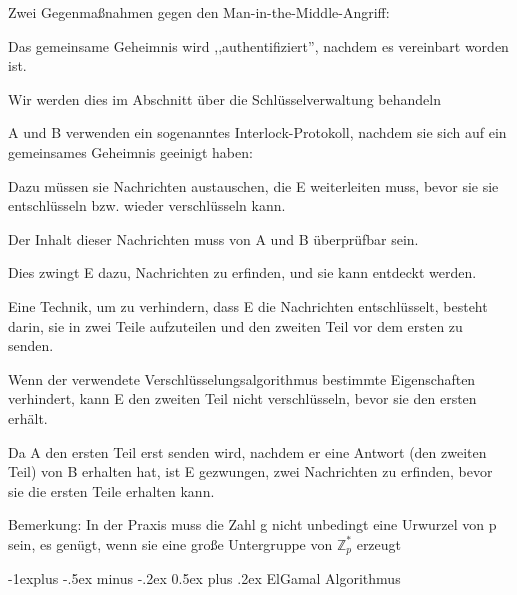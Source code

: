 \documentclass[a4paper]{article}
\makeatletter
\renewcommand{\subsection}{\@startsection{subsection}{2}{0mm}%
 {-1explus -.5ex minus -.2ex}%
 {0.5ex plus .2ex}%
 {\normalfont\normalsize\bfseries}}
\makeatother
\begin{document}
\begin{multicols}{3}
\begin{itemize*}
\begin{itemize*}
            \end{itemize*}
            \item Zwei Gegenmaßnahmen gegen den Man-in-the-Middle-Angriff:
            \begin{itemize*}
                  \item Das gemeinsame Geheimnis wird ,,authentifiziert'', nachdem es vereinbart worden ist.
                  \begin{itemize*} \item Wir werden dies im Abschnitt über die Schlüsselverwaltung behandeln \end{itemize*}
                  \item A und B verwenden ein sogenanntes Interlock-Protokoll, nachdem sie sich auf ein gemeinsames Geheimnis geeinigt haben:
                  \begin{itemize*} \item Dazu müssen sie Nachrichten austauschen, die E weiterleiten muss, bevor sie sie entschlüsseln bzw. wieder verschlüsseln kann. \item Der Inhalt dieser Nachrichten muss von A und B überprüfbar sein. \item Dies zwingt E dazu, Nachrichten zu erfinden, und sie kann entdeckt werden. \item Eine Technik, um zu verhindern, dass E die Nachrichten entschlüsselt, besteht darin, sie in zwei Teile aufzuteilen und den zweiten Teil vor dem ersten zu senden.
                        \begin{itemize*} \item Wenn der verwendete Verschlüsselungsalgorithmus bestimmte Eigenschaften verhindert, kann E den zweiten Teil nicht verschlüsseln, bevor sie den ersten erhält. \item Da A den ersten Teil erst senden wird, nachdem er eine Antwort (den zweiten Teil) von B erhalten hat, ist E gezwungen, zwei Nachrichten zu erfinden, bevor sie die ersten Teile erhalten kann. \end{itemize*} \end{itemize*}
            \end{itemize*}
            \item Bemerkung: In der Praxis muss die Zahl g nicht unbedingt eine Urwurzel
            von p sein, es genügt, wenn sie eine große Untergruppe von
            $\mathbb{Z}^*_p$ erzeugt
      \end{itemize*}


      \subsection{ElGamal Algorithmus}


\end{multicols}
\end{document}
